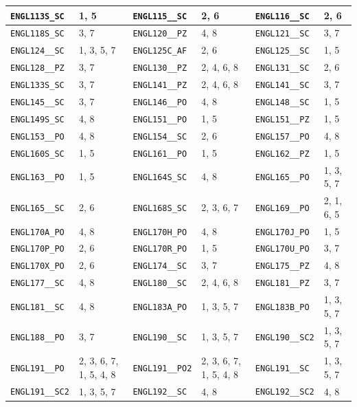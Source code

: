\begin{longtable}{|l|l||l|l||l|l|}
    \verb|ENGL113S_SC| & 1, 5 & \verb|ENGL115__SC| & 2, 6 & \verb|ENGL116__SC| & 2, 6\\\hline
    \verb|ENGL118S_SC| & 3, 7 & \verb|ENGL120__PZ| & 4, 8 & \verb|ENGL121__SC| & 3, 7\\\hline
    \verb|ENGL124__SC| & 1, 3, 5, 7 & \verb|ENGL125C_AF| & 2, 6 & \verb|ENGL125__SC| & 1, 5\\\hline
    \verb|ENGL128__PZ| & 3, 7 & \verb|ENGL130__PZ| & 2, 4, 6, 8 & \verb|ENGL131__SC| & 2, 6\\\hline
    \verb|ENGL133S_SC| & 3, 7 & \verb|ENGL141__PZ| & 2, 4, 6, 8 & \verb|ENGL141__SC| & 3, 7\\\hline
    \verb|ENGL145__SC| & 3, 7 & \verb|ENGL146__PO| & 4, 8 & \verb|ENGL148__SC| & 1, 5\\\hline
    \verb|ENGL149S_SC| & 4, 8 & \verb|ENGL151__PO| & 1, 5 & \verb|ENGL151__PZ| & 1, 5\\\hline
    \verb|ENGL153__PO| & 4, 8 & \verb|ENGL154__SC| & 2, 6 & \verb|ENGL157__PO| & 4, 8\\\hline
    \verb|ENGL160S_SC| & 1, 5 & \verb|ENGL161__PO| & 1, 5 & \verb|ENGL162__PZ| & 1, 5\\\hline
    \verb|ENGL163__PO| & 1, 5 & \verb|ENGL164S_SC| & 4, 8 & \verb|ENGL165__PO| & 1, 3, 5, 7\\\hline
    \verb|ENGL165__SC| & 2, 6 & \verb|ENGL168S_SC| & 2, 3, 6, 7 & \verb|ENGL169__PO| & 2, 1, 6, 5\\\hline
    \verb|ENGL170A_PO| & 4, 8 & \verb|ENGL170H_PO| & 4, 8 & \verb|ENGL170J_PO| & 1, 5\\\hline
    \verb|ENGL170P_PO| & 2, 6 & \verb|ENGL170R_PO| & 1, 5 & \verb|ENGL170U_PO| & 3, 7\\\hline
    \verb|ENGL170X_PO| & 2, 6 & \verb|ENGL174__SC| & 3, 7 & \verb|ENGL175__PZ| & 4, 8\\\hline
    \verb|ENGL177__SC| & 4, 8 & \verb|ENGL180__SC| & 2, 4, 6, 8 & \verb|ENGL181__PZ| & 3, 7\\\hline
    \verb|ENGL181__SC| & 4, 8 & \verb|ENGL183A_PO| & 1, 3, 5, 7 & \verb|ENGL183B_PO| & 1, 3, 5, 7\\\hline
    \verb|ENGL188__PO| & 3, 7 & \verb|ENGL190__SC| & 1, 3, 5, 7 & \verb|ENGL190__SC2| & 1, 3, 5, 7\\\hline
    \verb|ENGL191__PO| & 2, 3, 6, 7, 1, 5, 4, 8 & \verb|ENGL191__PO2| & 2, 3, 6, 7, 1, 5, 4, 8 & \verb|ENGL191__SC| & 1, 3, 5, 7\\\hline
    \verb|ENGL191__SC2| & 1, 3, 5, 7 & \verb|ENGL192__SC| & 4, 8 & \verb|ENGL192__SC2| & 4, 8\\\hline

\end{longtable}
